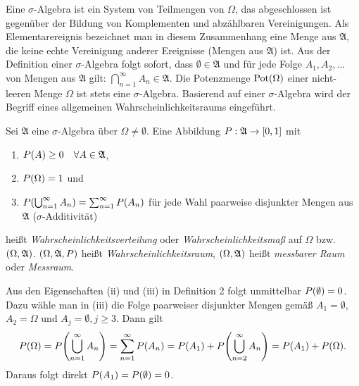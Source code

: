 \documentclass{lecture}
\begin{document}
    Eine \(\sigma\)-Algebra ist ein System von Teilmengen von \(\Omega\), das abgeschlossen ist gegenüber der Bildung von Komplementen und abzählbaren Vereinigungen.
    Als Elementarereignis bezeichnet man in diesem Zusammenhang eine Menge aus \(\mathfrak{A}\), die keine echte Vereinigung anderer Ereignisse (Mengen aus \(\mathfrak{A}\)) ist.
    Aus der Definition einer \(\sigma\)-Algebra folgt sofort, dass \(\emptyset \in \mathfrak{A}\) und für jede Folge \(A_1, A_2, \ldots\) von Mengen aus \(\mathfrak{A}\) gilt: \(\bigcap_{n = 1}^\infty A_n \in \mathfrak{A}\).
    Die Potenzmenge \(\Pot\parentheses*{\Omega}\) einer nicht-leeren Menge \(\Omega\) ist stets eine \(\sigma\)-Algebra.
    Basierend auf einer \(\sigma\)-Algebra wird der Begriff eines allgemeinen Wahrscheinlichkeitsraums eingeführt.

    \begin{definition}
        Sei \(\mathfrak{A}\) eine \(\sigma\)-Algebra über \(\Omega \ne \emptyset\).
        Eine Abbildung \(P: \mathfrak{A} \to \brackets*{0, 1}\) mit
        \begin{enumerate}
            \item \(P\parentheses*{A} \ge 0 \quad \forall A \in \mathfrak{A}\),
            \item \(P\parentheses*{\Omega} = 1\) und
            \item \(P\parentheses*{\bigcup_{n = 1}^\infty A_n} = \sum_{n = 1}^\infty P\parentheses*{A_n}\) für jede Wahl paarweise disjunkter Mengen aus \(\mathfrak{A}\) (\(\sigma\)-Additivität)
        \end{enumerate}
        heißt \emph{Wahrscheinlichkeitsverteilung} oder \emph{Wahrscheinlichkeitsmaß} auf \(\Omega\) bzw. \(\parentheses*{\Omega, \mathfrak{A}}\).
        \(\parentheses*{\Omega, \mathfrak{A}, P}\) heißt \emph{Wahrscheinlichkeitsraum}, \(\parentheses*{\Omega, \mathfrak{A}}\) heißt \emph{messbarer Raum} oder \emph{Messraum}.
    \end{definition}

    Aus den Eigenschaften (ii) und (iii) in Definition 2 folgt unmittelbar \(P\parentheses*{\emptyset} = 0\).
    Dazu wähle man in (iii) die Folge paarweiser disjunkter Mengen gemäß \(A_1 = \emptyset\), \(A_2 = \Omega\) und \(A_j = \emptyset, j \ge 3\).
    Dann gilt
    \[
        P\parentheses*{\Omega} = P\parentheses*{\bigcup_{n = 1}^\infty A_n} = \sum_{n = 1}^\infty P\parentheses*{A_n} = P\parentheses*{A_1} + P\parentheses*{\bigcup_{n = 2}^\infty A_n} = P\parentheses*{A_1} + P\parentheses*{\Omega}.
    \]
    Daraus folgt direkt \(P\parentheses*{A_1} = P\parentheses*{\emptyset} = 0\).
\end{document}
